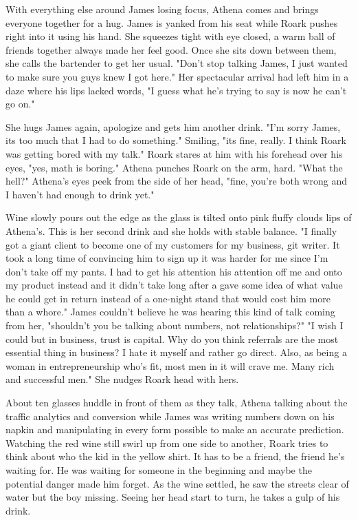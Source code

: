 		With everything else around James losing focus, Athena comes and brings everyone together for a hug. James is yanked from his seat 
	while Roark pushes right into it using his hand. She squeezes tight with eye closed, a warm ball of friends together always made her feel 
	good. Once she sits down between them, she calls the bartender to get her usual. "Don't stop talking James, I just wanted to make sure you
	guys knew I got here." Her spectacular arrival had left him in a daze where his lips lacked words, "I guess what he's trying to say is now
	he can't go on."

		She hugs James again, apologize and gets him another drink. "I'm sorry James, its too much that I had to do something." Smiling, "its
	fine, really. I think Roark was getting bored with my talk." Roark stares at him with his forehead over his eyes, "yes, math is boring." 
	Athena punches Roark on the arm, hard. "What the hell?" Athena's eyes peek from the side of her head, "fine, you're both wrong and I haven't
	had enough to drink yet."

		Wine slowly pours out the edge as the glass is tilted onto pink fluffy clouds lips of Athena's. This is her second drink and she holds
	with stable balance. "I finally got a giant client to become one of my customers for my business, git writer. It took a long time of 
	convincing him to sign up it was harder for me since I'm don't take off my pants. I had to get his attention his attention off me and onto my
	product instead and it didn't take long after a gave some idea of what value he could get in return instead of a one-night stand that would
	cost him more than a whore." James couldn't believe he was hearing this kind of talk coming from her, "shouldn't you be talking about numbers,
	not relationships?" "I wish I could but in business, trust is capital. Why do you think referrals are the most essential thing in business? I
	hate it myself and rather go direct. Also, as being a woman in entrepreneurship who's fit, most men in it will crave me. Many rich and 
	successful men." She nudges Roark head with hers.

		About ten glasses huddle in front of them as they talk, Athena talking about the traffic analytics and conversion while James was
	writing numbers down on his napkin and manipulating in every form possible to make an accurate prediction. Watching the red wine still
	swirl up from one side to another, Roark tries to think about who the kid in the yellow shirt. It has to be a friend, the friend he's waiting
	for. He was waiting for someone in the beginning and maybe the potential danger made him forget.  As the wine settled, he saw the streets
	clear of water but the boy missing. Seeing her head start to turn, he takes a gulp of his drink.

